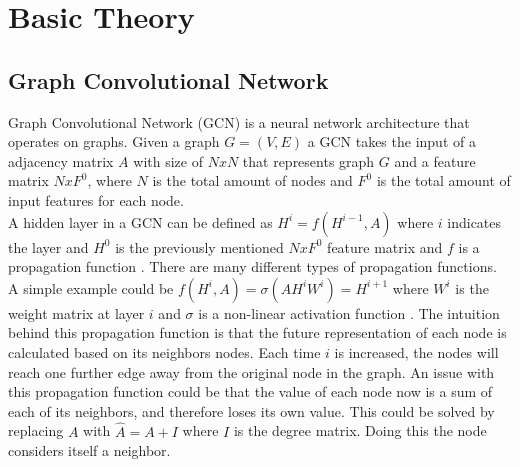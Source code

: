 \section{Basic Theory}

\subsection{Graph Convolutional Network}
Graph Convolutional Network (GCN) is a neural network architecture that operates on graphs.
Given a graph $G = (V,E)$ a GCN takes the input of a adjacency
matrix $A$ with size of $N x N$ that represents graph $G$ and a feature matrix $N x F^0$, where $N$ is the total amount of nodes and $F^0$ is the total amount of input features for each node.\\
\indent
A hidden layer in a GCN can be defined as $H^i = f(H^{i-1}, A)$ where $i$ indicates the layer and $H^0$ is the previously mentioned $N x F^0$ feature matrix and $f$ is a propagation function \cite{Deep-Learning-on-Graphs-with-GCN}.
There are many different types of propagation functions.
A simple example could be $f(H^i, A) = \sigma(AH^iW^i) = H^{i+1}$ where $W^i$ is the weight matrix at layer $i$ and $\sigma$ is a non-linear activation function \cite{Deep-Learning-on-Graphs-with-GCN}.
The intuition behind this propagation function is that the future representation of each node is calculated based on its neighbors nodes.
Each time $i$ is increased, the nodes will reach one further edge away from the original node in the graph. %
An issue with this propagation function could be that the value of each node now is a sum of each of its neighbors, and therefore loses its own value.
This could be solved by replacing $A$ with $\hat{A} = A + I$ where $I$ is the degree matrix.
Doing this the node considers itself a neighbor.
